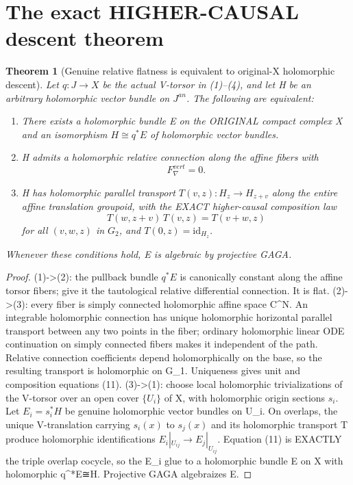 \documentclass[11pt]{article}
\newtheorem{theorem}{Theorem}
\begin{document}
\section{The exact HIGHER-CAUSAL descent theorem}
\begin{theorem}[Genuine relative flatness is equivalent to original-X holomorphic descent]
Let $q:J\to X$ be the actual V-torsor in
(1)--(4), and let H be an arbitrary
holomorphic vector bundle on $J^{an}$.
The following are equivalent:
\begin{enumerate}
\item There exists a holomorphic bundle E
on the ORIGINAL compact complex X and
an isomorphism $H\cong q^*E$ of
holomorphic vector bundles.
\item H admits a holomorphic relative
connection along the affine fibers with
\[
 \boxed{F^{vert}_\nabla=0.}                    \tag{10}
\]
\item H has holomorphic parallel transport
$T(v,z):H_z\to H_{z+v}$ along the entire
affine translation groupoid, with
the EXACT higher-causal composition law
\[
 \boxed{T(w,z+v)\,T(v,z)=T(v+w,z)}
 \tag{11}
\]
for all $(v,w,z)$ in $G_2$, and
$T(0,z)=\mathrm{id}_{H_z}$.
\end{enumerate}
Whenever these conditions hold, E is
algebraic by projective GAGA.
\end{theorem}
\begin{proof}
(1)->(2): the pullback bundle
$q^*E$ is canonically constant along
the affine torsor fibers; give it
the tautological relative differential
connection. It is flat.
(2)->(3): every fiber is simply
connected holomorphic affine space C^N.
An integrable holomorphic connection
has unique holomorphic horizontal
parallel transport between any two
points in the fiber; ordinary holomorphic
linear ODE continuation on simply connected
fibers makes it independent of the
path. Relative connection coefficients
depend holomorphically on the base,
so the resulting transport is holomorphic
on G_1. Uniqueness gives unit and
composition equations (11).
(3)->(1): choose local holomorphic
trivializations of the V-torsor over
an open cover $\{U_i\}$ of X, with
holomorphic origin sections $s_i$.
Let $E_i=s_i^*H$ be genuine
holomorphic vector bundles on U_i.
On overlaps, the unique V-translation
carrying $s_i(x)$ to $s_j(x)$ and its
holomorphic transport T produce
holomorphic identifications
$E_i|_{U_{ij}}\to E_j|_{U_{ij}}$.
Equation (11) is EXACTLY the triple
overlap cocycle, so the E_i glue
to a holomorphic bundle E on X
with holomorphic q^*E≅H.
Projective GAGA algebraizes E.
\end{proof}
\end{document}
